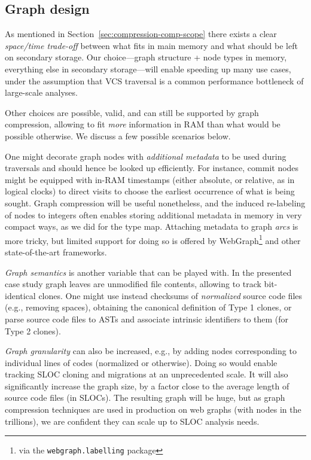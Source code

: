 \subsection{Graph design}

As mentioned in Section~\ref{sec:compression-comp-scope} there exists a clear
\emph{space/time trade-off} between what fits in main memory and what should be
left on secondary storage. Our choice---graph structure + node types in memory,
everything else in secondary storage---will enable speeding up many use cases,
under the assumption that VCS traversal is a common performance bottleneck of
large-scale analyses.

Other choices are possible, valid, and can still be supported by graph
compression, allowing to fit \emph{more} information in RAM than what would be
possible otherwise. We discuss a few possible scenarios below.

One might decorate graph nodes with \emph{additional metadata} to be used
during traversals and should hence be looked up efficiently. For instance,
commit nodes might be equipped with in-RAM timestamps (either absolute, or
relative, as in logical clocks) to direct visits to choose the earliest
occurrence of what is being sought.
Graph compression will be useful nonetheless, and the induced re-labeling of
nodes to integers often enables storing additional metadata in memory in very
compact ways, as we did for the type map.  Attaching metadata to graph
\emph{arcs} is more tricky, but limited support for doing so is offered by
WebGraph\footnote{via the \texttt{webgraph.labelling} package} and other
state-of-the-art frameworks.

\emph{Graph semantics} is another variable that can be played with. In the
presented case study graph leaves are unmodified file contents, allowing to
track bit-identical clones. One might use instead checksums of
\emph{normalized} source code files (e.g., removing spaces), obtaining the
canonical definition of Type 1 clones, or parse source code files to ASTs and
associate intrinsic identifiers to them (for Type 2 clones).

\emph{Graph granularity} can also be increased, e.g., by adding nodes
corresponding to individual lines of codes (normalized or otherwise). Doing so
would enable tracking SLOC cloning and migrations at an unprecedented scale. It
will also significantly increase the graph size, by a factor close to the
average length of source code files (in SLOCs). The resulting graph will be
huge, but as graph compression techniques are used in production on web graphs
(with nodes in the trillions), we are confident they can scale up to SLOC
analysis needs.


